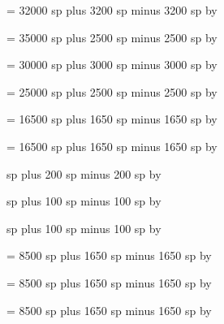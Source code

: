 \newskip\interwordspacenotes
\interwordspacenotes = 32000 sp plus 3200 sp minus 3200 sp
\multiply\interwordspacenotes by \factor

\newskip\interwordspacenotestext
\interwordspacenotestext = 35000 sp plus 2500 sp minus 2500 sp
\multiply\interwordspacenotestext by \factor

\newskip\interwordspacetextnotes
\interwordspacetextnotes = 30000 sp plus 3000 sp minus 3000 sp
\multiply\interwordspacetextnotes by \factor

\newskip\interwordspacetext
\interwordspacetext = 25000 sp plus 2500 sp minus 2500 sp
\multiply\interwordspacetext by \factor

\newskip\bispace
\bispace = 16500 sp plus 1650 sp minus 1650 sp
\multiply\bispace by \factor

\newskip\trispace
\trispace = 16500 sp plus 1650 sp minus 1650 sp
\multiply\trispace by \factor

\newskip\punctuminclinatumshift
{} sp plus 200 sp minus 200 sp
\multiply\punctuminclinatumshift by \factor

\newskip\punctuminclinatumanddebilisshift
{} sp plus 100 sp minus 100 sp
\multiply\punctuminclinatumanddebilisshift by \factor

\newskip\punctuminclinatumdebilisshift
{} sp plus 100 sp minus 100 sp
\multiply\punctuminclinatumdebilisshift by \factor

\newskip\spacebeforesmallbar
\spacebeforesmallbar = 8500 sp plus 1650 sp minus 1650 sp
\multiply\spacebeforesmallbar by \factor

\newskip\spaceaftersmallbar
\spaceaftersmallbar = 8500 sp plus 1650 sp minus 1650 sp
\multiply\spaceaftersmallbar by \factor

\newskip\spacebeforeminor
\spacebeforeminor = 8500 sp plus 1650 sp minus 1650 sp
\multiply\spacebeforeminor by \factor

